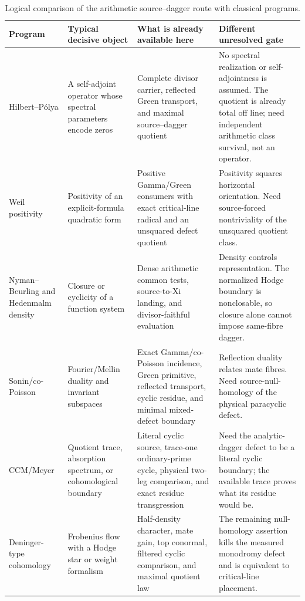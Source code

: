 \documentclass[11pt]{article}
\theoremstyle{definition}
\theoremstyle{remark}
\begin{document}
\begin{table}[p]
\centering
\footnotesize
\begin{tabularx}{\textwidth}{>{\raggedright\arraybackslash}p{}
                              >{\raggedright\arraybackslash}p{}
                              >{\raggedright\arraybackslash}X
                              >{\raggedright\arraybackslash}p{}}
\toprule
Program & Typical decisive object & What is already available here & Different unresolved gate \\
\midrule
Hilbert--P\'olya & A self-adjoint operator whose spectral parameters encode zeros & Complete divisor carrier, reflected Green transport, and maximal source--dagger quotient & No spectral realization or self-adjointness is assumed.  The quotient is already total off line; need independent arithmetic class survival, not an operator. \\
\addlinespace
Weil positivity & Positivity of an explicit-formula quadratic form & Positive Gamma/Green consumers with exact critical-line radical and an unsquared defect quotient & Positivity squares horizontal orientation.  Need source-forced nontriviality of the unsquared quotient class. \\
\addlinespace
Nyman--Beurling and Hedenmalm density & Closure or cyclicity of a function system & Dense arithmetic common tests, source-to-Xi landing, and divisor-faithful evaluation & Density controls representation.  The normalized Hodge boundary is nonclosable, so closure alone cannot impose same-fibre dagger. \\
\addlinespace
Sonin/co-Poisson & Fourier/Mellin duality and invariant subspaces & Exact Gamma/co-Poisson incidence, Green primitive, reflected transport, cyclic residue, and minimal mixed-defect boundary & Reflection duality relates mate fibres.  Need source-null-homology of the physical paracyclic defect. \\
\addlinespace
CCM/Meyer & Quotient trace, absorption spectrum, or cohomological boundary & Literal cyclic source, trace-one ordinary-prime cycle, physical two-leg comparison, and exact residue transgression & Need the analytic-dagger defect to be a literal cyclic boundary; the available trace proves what its residue would be. \\
\addlinespace
Deninger-type cohomology & Frobenius flow with a Hodge star or weight formalism & Half-density character, mate gain, top conormal, filtered cyclic comparison, and maximal quotient law & The remaining null-homology assertion kills the measured monodromy defect and is equivalent to critical-line placement. \\
\bottomrule
\end{tabularx}
\caption{Logical comparison of the arithmetic source--dagger route with classical programs.}
\label{tab:routes}
\end{table}
\end{document}
